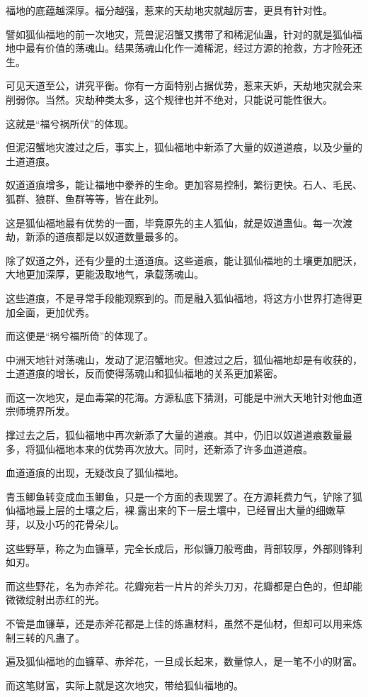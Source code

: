 \begin{this_body}
福地的底蕴越深厚。福分越强，惹来的天劫地灾就越厉害，更具有针对性。

譬如狐仙福地的前一次地灾，荒兽泥沼蟹又携带了和稀泥仙蛊，针对的就是狐仙福地中最有价值的荡魂山。结果荡魂山化作一滩稀泥，经过方源的抢救，方才险死还生。

可见天道至公，讲究平衡。你有一方面特别占据优势，惹来天妒，天劫地灾就会来削弱你。当然。灾劫种类太多，这个规律也并不绝对，只能说可能性很大。

这就是“福兮祸所伏”的体现。

但泥沼蟹地灾渡过之后，事实上，狐仙福地中新添了大量的奴道道痕，以及少量的土道道痕。

奴道道痕增多，能让福地中豢养的生命。更加容易控制，繁衍更快。石人、毛民、狐群、狼群、鱼群等等，皆在此列。

这是狐仙福地最有优势的一面，毕竟原先的主人狐仙，就是奴道蛊仙。每一次渡劫，新添的道痕都是以奴道数量最多的。

除了奴道之外，还有少量的土道道痕。这些道痕，能让狐仙福地的土壤更加肥沃，大地更加深厚，更能汲取地气，承载荡魂山。

这些道痕，不是寻常手段能观察到的。而是融入狐仙福地，将这方小世界打造得更加全面，更加优秀。

而这便是“祸兮福所倚”的体现了。

中洲天地针对荡魂山，发动了泥沼蟹地灾。但渡过之后，狐仙福地却是有收获的，土道道痕的增长，反而使得荡魂山和狐仙福地的关系更加紧密。

而这一次地灾，是血毒棠的花海。方源私底下猜测，可能是中洲大天地针对他血道宗师境界所发。

撑过去之后，狐仙福地中再次新添了大量的道痕。其中，仍旧以奴道道痕数量最多，将狐仙福地本来的优势再次放大。同时，还新添了许多血道道痕。

血道道痕的出现，无疑改良了狐仙福地。

青玉鲫鱼转变成血玉鲫鱼，只是一个方面的表现罢了。在方源耗费力气，铲除了狐仙福地最上层的土壤之后，裸.露出来的下一层土壤中，已经冒出大量的细嫩草芽，以及小巧的花骨朵儿。

这些野草，称之为血镰草，完全长成后，形似镰刀般弯曲，背部较厚，外部则锋利如刃。

而这些野花，名为赤斧花。花瓣宛若一片片的斧头刀刃，花瓣都是白色的，但却能微微绽射出赤红的光。

不管是血镰草，还是赤斧花都是上佳的炼蛊材料，虽然不是仙材，但却可以用来炼制三转的凡蛊了。

遍及狐仙福地的血镰草、赤斧花，一旦成长起来，数量惊人，是一笔不小的财富。

而这笔财富，实际上就是这次地灾，带给狐仙福地的。


\end{this_body}
